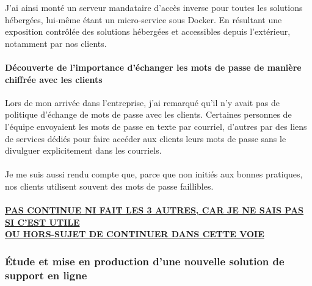 \begin{sloppypar}
\noindent J'ai ainsi monté un serveur mandataire d'accès inverse pour toutes les solutions hébergées, lui-même étant un micro-service sous Docker. En résultant une exposition contrôlée des solutions hébergées et accessibles depuis l'extérieur, notamment par nos clients.

\paragraph{Découverte de l'importance d'échanger les mots de passe de manière chiffrée avec les clients}

Lors de mon arrivée dans l'entreprise, j'ai remarqué qu'il n'y avait pas de politique d'échange de mots de passe avec les clients. Certaines personnes de l'équipe envoyaient les mots de passe en texte par courriel, d'autres par des liens de services dédiés pour faire accéder aux clients leurs mots de passe sans le divulguer explicitement dans les courriels.
\\ \\
Je me suis aussi rendu compte que, parce que non initiés aux bonnes pratiques, nos clients utilisent souvent des mots de passe faillibles. 
\\ \\
\underline{\textbf{PAS CONTINUE NI FAIT LES 3 AUTRES, CAR JE NE SAIS PAS SI C'EST UTILE}}
\\
\underline{\textbf{OU HORS-SUJET DE CONTINUER DANS CETTE VOIE}}

\subsubsection{Étude et mise en production d'une nouvelle solution de support en ligne}


\end{sloppypar}
